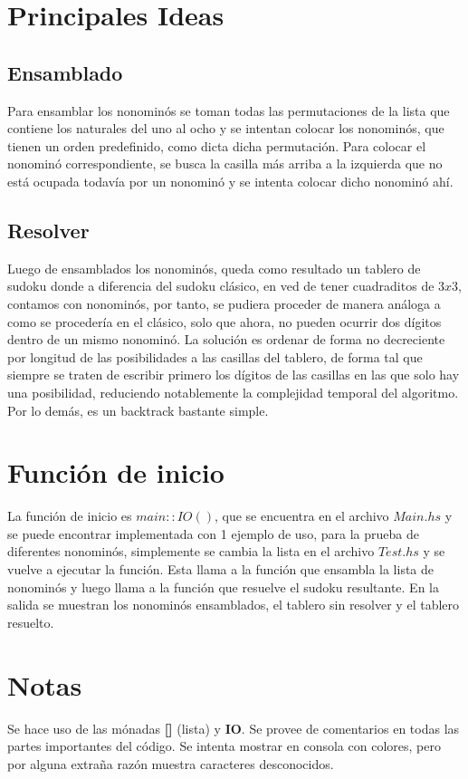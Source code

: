 \documentclass[a4paper, 10pt]{article}
\begin{document}
	\section{Principales Ideas}
	\subsection{Ensamblado}
	Para ensamblar los nonominós se toman todas las permutaciones de la lista que contiene
	los naturales del uno al ocho y se intentan colocar los nonominós, que tienen un orden
	predefinido, como dicta dicha permutación. Para colocar el nonominó correspondiente,
	se busca la casilla más arriba a la izquierda que no está ocupada todavía por un nonominó y
	se intenta colocar dicho nonominó ahí.

	\subsection{Resolver}
	Luego de ensamblados los nonominós, queda como resultado un tablero de sudoku donde a diferencia
	del sudoku clásico, en ved de tener cuadraditos de $3 x 3$, contamos con nonominós, por tanto,
	se pudiera proceder de manera análoga a como se procedería en el clásico, solo que ahora, no pueden
	ocurrir dos dígitos dentro de un mismo nonominó. La solución es ordenar de forma no decreciente 
	por longitud de las posibilidades
	a las casillas del tablero, de forma tal que siempre se traten de escribir primero los dígitos
	de las casillas en las que solo hay una posibilidad, reduciendo notablemente la complejidad
	temporal del algoritmo. Por lo demás, es un backtrack bastante simple.

	\section{Función de inicio}
	La función de inicio es $main :: IO ()$, que se encuentra en el archivo $Main.hs$
	y se puede encontrar implementada con 1 ejemplo de uso, para la prueba de diferentes
	nonominós, simplemente se cambia la lista en el archivo $Test.hs$ y se vuelve a ejecutar la función.
	Esta llama a la función que ensambla la lista de nonominós y luego llama a la función que
	resuelve el sudoku resultante. En la salida se muestran los nonominós ensamblados, el tablero
	sin resolver y el tablero resuelto.

	\section{Notas}
	Se hace uso de las mónadas {\bfseries []} (lista) y {\bfseries IO}.
	Se provee de comentarios en todas las partes importantes del código.
	Se intenta mostrar en consola con colores, pero por alguna extraña razón muestra caracteres
	desconocidos.
\end{document}
